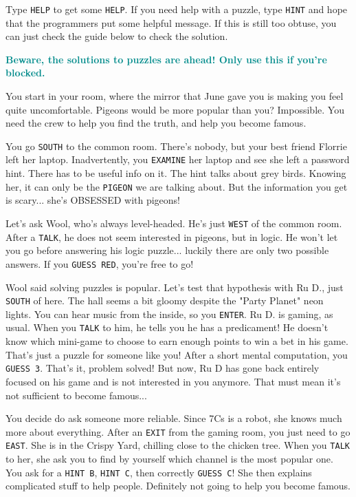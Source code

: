 \documentclass{article}
\newcommand{\bo}[1] {\textbf{#1}}
\newcommand{\bblu}[1] {\textbf{\textcolor{darkcyan}{#1}}}
\newcommand{\bckg}[1]{\AddToShipoutPictureBG*{\texttt{[image: \#1]}}}
\begin{document}
Type \texttt{HELP} to get some \texttt{HELP}.
If you need help with a puzzle, type \texttt{HINT} and hope that the programmers put some helpful message.
If this is still too obtuse, you can just check the guide below to check the solution.

\clearpage

\clearpage
{}
\bckg{img/bg}

\bblu{\bo{Beware, the solutions to puzzles are ahead! Only use this if you're blocked.}}

You start in your room, where the mirror that June gave you is making you feel quite uncomfortable.
Pigeons would be more popular than you? Impossible.
You need the crew to help you find the truth, and help you become famous.

You go \texttt{SOUTH} to the common room.
There's nobody, but your best friend Florrie left her laptop.
Inadvertently, you \texttt{EXAMINE} her laptop and see she left a password hint.
There has to be useful info on it. The hint talks about grey birds.
Knowing her, it can only be the \texttt{PIGEON} we are talking about.
But the information you get is scary... she's OBSESSED with pigeons!

Let's ask Wool, who's always level-headed. He's just \texttt{WEST} of the common room.
After a \texttt{TALK}, he does not seem interested in pigeons, but in logic.
He won't let you go before answering his logic puzzle... luckily there are only two possible answers.
If you \texttt{GUESS RED}, you're free to go!

Wool said solving puzzles is popular.
Let's test that hypothesis with Ru D., just \texttt{SOUTH} of here.
The hall seems a bit gloomy despite the "Party Planet" neon lights.
You can hear music from the inside, so you \texttt{ENTER}.
Ru D. is gaming, as usual. When you \texttt{TALK} to him, he tells you he has a predicament!
He doesn't know which mini-game to choose to earn enough points to win a bet in his game.
That's just a puzzle for someone like you!
After a short mental computation, you \texttt{GUESS 3}. That's it, problem solved!
But now, Ru D has gone back entirely focused on his game and is not interested in you anymore.
That must mean it's not sufficient to become famous...

\clearpage
{}
\bckg{img/bg}

You decide do ask someone more reliable.
Since 7Cs is a robot, she knows much more about everything.
After an \texttt{EXIT} from the gaming room, you just need to go \texttt{EAST}.
She is in the Crispy Yard, chilling close to the chicken tree.
When you \texttt{TALK} to her, she ask you to find by yourself which channel is the most popular one.
You ask for a \texttt{HINT B}, \texttt{HINT C}, then correctly \texttt{GUESS C}!
She then explains complicated stuff to help people.
Definitely not going to help you become famous.
\end{document}

